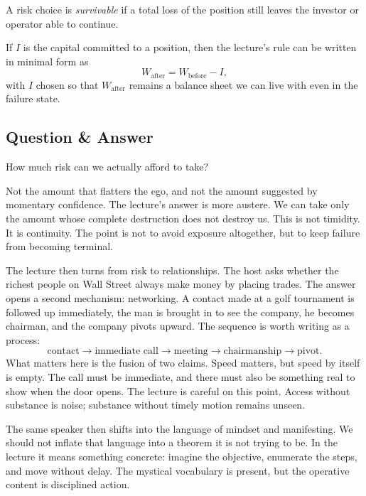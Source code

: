 \begin{definition}
A risk choice is \emph{survivable} if a total loss of the position still leaves the investor or operator able to continue.
\end{definition}

If \(I\) is the capital committed to a position, then the lecture's rule can be written in minimal form as
\begin{equation}
W_{\mathrm{after}} = W_{\mathrm{before}} - I,
\end{equation}
with \(I\) chosen so that \(W_{\mathrm{after}}\) remains a balance sheet we can live with even in the failure state.

\subsection{Question \& Answer}

How much risk can we actually afford to take?

Not the amount that flatters the ego, and not the amount suggested by momentary confidence. The lecture's answer is more austere. We can take only the amount whose complete destruction does not destroy us. This is not timidity. It is continuity. The point is not to avoid exposure altogether, but to keep failure from becoming terminal.

The lecture then turns from risk to relationships. The host asks whether the richest people on Wall Street always make money by placing trades. The answer opens a second mechanism: networking. A contact made at a golf tournament is followed up immediately, the man is brought in to see the company, he becomes chairman, and the company pivots upward. The sequence is worth writing as a process:
\begin{equation}
\text{contact} \to \text{immediate call} \to \text{meeting} \to \text{chairmanship} \to \text{pivot}.
\end{equation}
What matters here is the fusion of two claims. Speed matters, but speed by itself is empty. The call must be immediate, and there must also be something real to show when the door opens. The lecture is careful on this point. Access without substance is noise; substance without timely motion remains unseen.

The same speaker then shifts into the language of mindset and manifesting. We should not inflate that language into a theorem it is not trying to be. In the lecture it means something concrete: imagine the objective, enumerate the steps, and move without delay. The mystical vocabulary is present, but the operative content is disciplined action.


